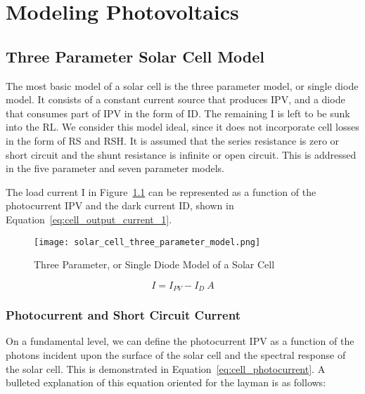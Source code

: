 \chapter{Modeling Photovoltaics}


\newpage
\section{Three Parameter Solar Cell Model}

The most basic model of a solar cell is the three parameter model, or single
diode model. It consists of a constant current source that produces \ac{IPV},
and a diode that consumes part of \ac{IPV} in the form of \ac{ID}. The
remaining \ac{I} is left to be sunk into the \ac{RL}. We consider this model
ideal, since it does not incorporate cell losses in the form of \ac{RS} and
\ac{RSH}. It is assumed that the series resistance is zero or short circuit and
the shunt resistance is infinite or open circuit. This is addressed in the five
parameter and seven parameter models.

The load current \ac*{I} in Figure~\ref{fig:single_diode_model} can be
represented as a function of the photocurrent \ac*{IPV} and the dark current
\ac*{ID}, shown in Equation~\ref{eq:cell_output_current_1}.

\begin{figure}[h]
    \texttt{[image: solar\_cell\_three\_parameter\_model.png]}
    \caption{Three Parameter, or Single Diode Model of a Solar Cell}
    \label{fig:single_diode_model}
\end{figure}

\begin{equation}
    I = I_{PV} - I_D~A
    \label{eq:cell_output_current_1}
\end{equation}

\subsection*{Photocurrent and Short Circuit Current}

On a fundamental level, we can define the photocurrent \ac{IPV} as a function of
the photons incident upon the surface of the solar cell and the spectral
response of the solar cell. This is demonstrated in
Equation~\ref{eq:cell_photocurrent}. A bulleted explanation of this equation
oriented for the layman is as follows:

